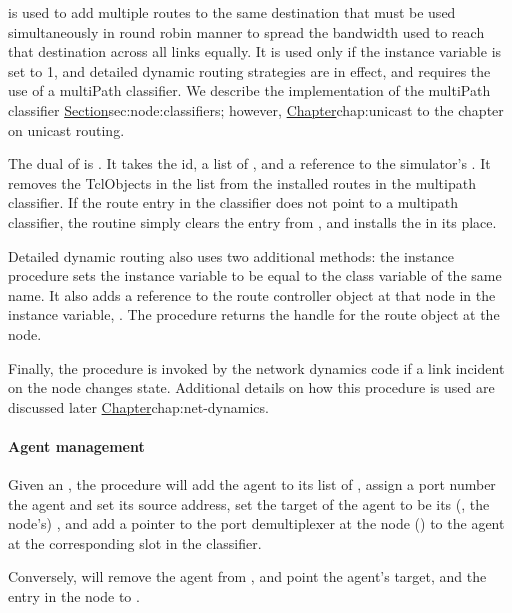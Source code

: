 is used to add multiple routes to the same destination that must be used
simultaneously in round robin manner to spread the bandwidth used to reach
that destination across all links equally.
It is used only if the instance variable  is set to 1,
and detailed dynamic routing strategies are in effect,
and requires the use of a multiPath classifier.
We describe the implementation of the multiPath classifier
\href{later in this chapter}{Section}{sec:node:classifiers};
however, \href{we defer the discussion of multipath
routing}{Chapter}{chap:unicast} to the chapter on unicast routing.

The dual of  is .
It takes the id, a list of , and a reference to
the simulator's .
It removes the TclObjects in the list from the installed routes in the
multipath classifier.
If the route entry in the classifier does not point to a multipath
classifier,
the routine simply clears the entry from , and
installs the  in its place.

Detailed dynamic routing also uses two additional methods:
the instance procedure  sets the instance variable
 to be equal to the class variable of the same name.
It also adds a reference to the route controller object at that node
in the instance variable, .
The procedure  returns the handle for the route object 
at the node.

Finally, the procedure  is invoked by
the network dynamics code if a link incident on the node
changes state.  Additional details on how this procedure
is used are discussed later
\href{in the chapter on network dynamics}{Chapter}{chap:net-dynamics}.

\paragraph{Agent management}
Given an , the procedure  will
add the agent to its list of ,
assign a port number the agent and set its source address,
set the target of the agent to be its (\ie, the node's) ,
and add a pointer to the port demultiplexer at the node ()
to the agent at the corresponding slot in the  classifier.

Conversely, will remove the agent from ,
and point the agent's target, and the entry in the node 
to .

